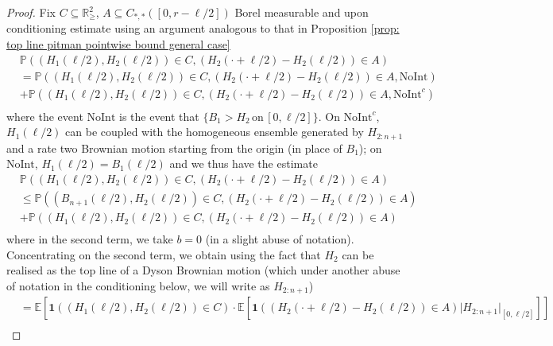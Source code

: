 \documentclass[11pt, reqno]{amsart}
\numberwithin{equation}{section}
\newcommand{\R}{\ensuremath{\mathbb{R}}}
\newcommand{\PP}{\ensuremath{\mathbb{P}}}
\begin{document}
\begin{proof}

Fix $C\subseteq \R^2_\ge$, $A\subseteq C_{*,*}([0,r-\ell/2])$ Borel measurable and upon conditioning estimate using an argument analogous to that in Proposition \ref{prop: top line pitman pointwise bound general case}
\begin{equation*}
    \begin{array}{cc}
         & \PP((H_1(\ell/2), H_2 (\ell/2))\in C, (H_2(\cdot + \ell/2)-H_2(\ell/2))\in A) \\
         & =\PP((H_1(\ell/2), H_2 (\ell/2))\in C, (H_2(\cdot + \ell/2)-H_2(\ell/2))\in A, \mathrm{NoInt}) \\
         & +  \PP((H_1(\ell/2), H_2 (\ell/2))\in C, (H_2(\cdot + \ell/2)-H_2(\ell/2))\in A, \mathrm{NoInt}^c) \\
    \end{array}
\end{equation*}
where the event $\mathrm{NoInt}$ is the event that $\{B_{1}>H_2\, \mathrm{on}\, [0,\ell/2]\}$. On $\mathrm{NoInt}^c$, $H_1(\ell/2)$ can be coupled with the homogeneous ensemble generated by $H_{2:n+1}$ and a rate two Brownian motion starting from the origin (in place of $B_{1}$); on $\mathrm{NoInt}$, $H_1(\ell/2) = B_{1}(\ell/2)$ and we thus have the estimate 
\begin{equation*}
    \begin{array}{cc}
         & \PP((H_1(\ell/2), H_2 (\ell/2))\in C, (H_2(\cdot + \ell/2)-H_2(\ell/2))\in A) \\
         & \le \PP((B_{n+1}(\ell/2), H_2 (\ell/2))\in C, (H_2(\cdot + \ell/2)-H_2(\ell/2))\in A) \\
         & +  \PP((H_1(\ell/2), H_2 (\ell/2))\in C, (H_2(\cdot + \ell/2)-H_2(\ell/2))\in A) \\
    \end{array}
\end{equation*}
where in the second term, we take $b=0$ (in a slight abuse of notation). Concentrating on the second term, we obtain using the fact that $H_2$ can be realised as the top line of a Dyson Brownian motion (which under another abuse of notation in the conditioning below, we will write as $H_{2:n+1}$)
\begin{equation*}
    \begin{array}{cc}
         & = \mathbb{E}\left[\mathbf{1}((H_1(\ell/2), H_2 (\ell/2))\in C)\cdot\mathbb{E}\left[\mathbf{1}((H_2(\cdot + \ell/2)-H_2(\ell/2))\in A)\lvert H_{2:n+1}|_{[0, \ell/2]}\right]\right]\\

\end{array}
\end{equation*}
\end{proof}
\end{document}
